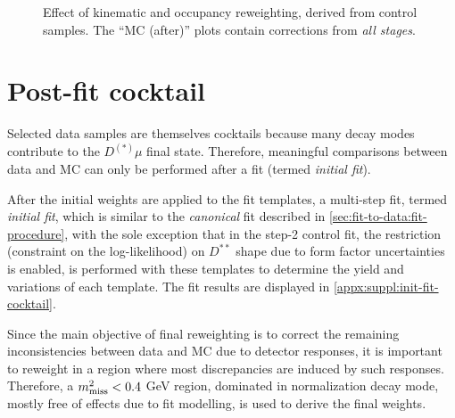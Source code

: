 \begin{figure}[htb]
    \caption{
        Effect of \B kinematic and occupancy reweighting,
        derived from \jpsi\kaon control samples.
        The ``MC (after)'' plots contain corrections from \emph{all stages}.
    }
    \label{fig:rwt-JpsiK}
\end{figure}


\section{Post-fit cocktail}
\label{ref:mc-cor:postfit-cocktail}

Selected data samples are themselves cocktails because many
decay modes contribute to the $D^{(*)}\mu$ final state.
Therefore, meaningful comparisons between data and MC can only be performed
after a fit (termed \emph{initial fit}).

After the initial weights are applied to the fit templates,
a multi-step fit,
termed \emph{initial fit},
which is similar to the \emph{canonical} fit described in
\cref{sec:fit-to-data:fit-procedure},
with the sole exception that in the step-2 control fit,
the restriction (constraint on the log-likelihood)
on $D^{**}$ shape due to form factor uncertainties is enabled,
is performed with these templates to determine the yield and variations of
each template.
The fit results are displayed in
\cref{appx:suppl:init-fit-cocktail}.

Since the main objective of final reweighting is to correct the remaining
inconsistencies between data and MC due to detector responses,
it is important to reweight in a region where most discrepancies are induced by
such responses.
Therefore, a $m^2_\text{miss} < 0.4$ GeV region,
dominated in normalization decay mode,
mostly free of effects due to fit modelling,
is used to derive the final weights.

